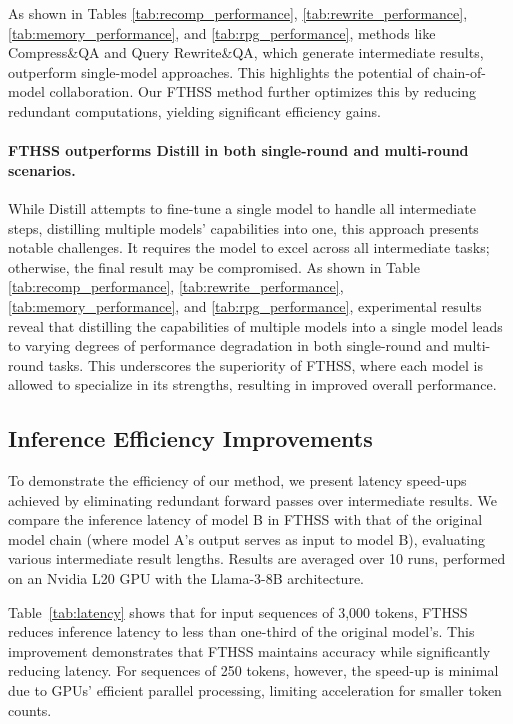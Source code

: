 As shown in Tables \ref{tab:recomp_performance}, \ref{tab:rewrite_performance}, \ref{tab:memory_performance}, and \ref{tab:rpg_performance}, methods like Compress\&QA and Query Rewrite\&QA, which generate intermediate results, outperform single-model approaches. This highlights the potential of chain-of-model collaboration. Our FTHSS method further optimizes this by reducing redundant computations, yielding significant efficiency gains.


\paragraph{FTHSS outperforms Distill in both single-round and multi-round scenarios.} While Distill attempts to fine-tune a single model to handle all intermediate steps, distilling multiple models’ capabilities into one, this approach presents notable challenges. It requires the model to excel across all intermediate tasks; otherwise, the final result may be compromised. As shown in Table \ref{tab:recomp_performance}, \ref{tab:rewrite_performance}, \ref{tab:memory_performance}, and \ref{tab:rpg_performance}, experimental results reveal that distilling the capabilities of multiple models into a single model leads to varying degrees of performance degradation in both single-round and multi-round tasks. This underscores the superiority of FTHSS, where each model is allowed to specialize in its strengths, resulting in improved overall performance.




\subsection{Inference Efficiency Improvements}
To demonstrate the efficiency of our method, we present latency speed-ups achieved by eliminating redundant forward passes over intermediate results. We compare the inference latency of model B in FTHSS with that of the original model chain (where model A's output serves as input to model B), evaluating various intermediate result lengths. Results are averaged over 10 runs, performed on an Nvidia L20 GPU with the Llama-3-8B architecture.

Table~\ref{tab:latency} shows that for input sequences of 3,000 tokens, FTHSS reduces inference latency to less than one-third of the original model's. This improvement demonstrates that FTHSS maintains accuracy while significantly reducing latency. For sequences of 250 tokens, however, the speed-up is minimal due to GPUs' efficient parallel processing, limiting acceleration for smaller token counts.


